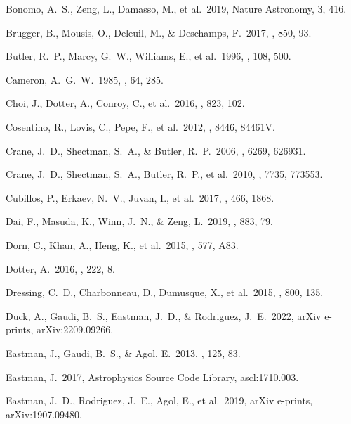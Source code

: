  Bonomo, A.~S., Zeng, L., Damasso, M., et al.\ 2019, Nature Astronomy, 3, 416.

 Brugger, B., Mousis, O., Deleuil, M., \& Deschamps, F.\ 2017, \apj, 850, 93.

 Butler, R.~P., Marcy, G.~W., Williams, E., et al.\ 1996, \pasp, 108, 500.

 Cameron, A.~G.~W.\ 1985, \icarus, 64, 285.

 Choi, J., Dotter, A., Conroy, C., et al.\ 2016, \apj, 823, 102.

 Cosentino, R., Lovis, C., Pepe, F., et al.\ 2012, \procspie, 8446, 84461V.

 Crane, J.~D., Shectman, S.~A., \& Butler, R.~P.\ 2006, \procspie, 6269, 626931.

 Crane, J.~D., Shectman, S.~A., Butler, R.~P., et al.\ 2010, \procspie, 7735, 773553.

 Cubillos, P., Erkaev, N.~V., Juvan, I., et al.\ 2017, \mnras, 466, 1868.

 Dai, F., Masuda, K., Winn, J.~N., \& Zeng, L.\ 2019, \apj, 883, 79.

 Dorn, C., Khan, A., Heng, K., et al.\ 2015, \aap, 577, A83.

 Dotter, A.\ 2016, \apjs, 222, 8.

 Dressing, C.~D., Charbonneau, D., Dumusque, X., et al.\ 2015, \apj, 800, 135.

 Duck, A., Gaudi, B.~S., Eastman, J.~D., \& Rodriguez, J.~E.\ 2022, arXiv e-prints, arXiv:2209.09266.

 Eastman, J., Gaudi, B.~S., \& Agol, E.\ 2013, \pasp, 125, 83.

 Eastman, J.\ 2017, Astrophysics Source Code Library, ascl:1710.003.

 Eastman, J.~D., Rodriguez, J.~E., Agol, E., et al.\ 2019, arXiv e-prints, arXiv:1907.09480.

